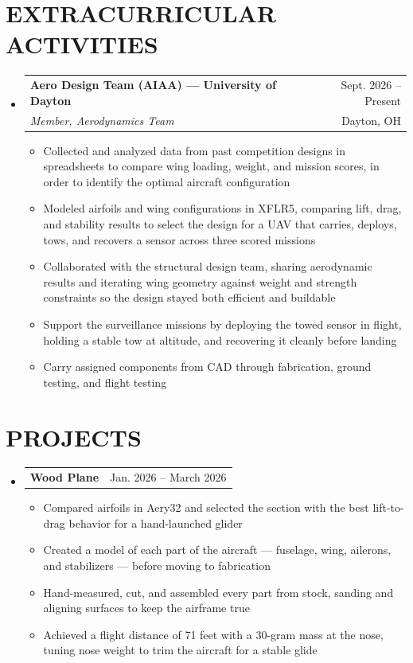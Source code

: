 \documentclass[letterpaper,11pt]{article}
\makeatletter
\newcommand{\resumeItem}[1]{
  \item\small{
    {#1 \vspace{-1pt}}
  }
}
\newcommand{\resumeSubheading}[4]{
  \vspace{-1pt}\item
    \begin{tabular*}{\textwidth}[t]{l@{\extracolsep{\fill}}r}
      \textbf{#1} & {\color{dark-grey}\small #2}\vspace{1pt}\\ %
      \textit{#3} & {\color{dark-grey} \small #4}\\ %
    \end{tabular*}\vspace{-4pt}
}
\newcommand{\resumeProjectHeading}[2]{
    \item
    \begin{tabular*}{\textwidth}{l@{\extracolsep{\fill}}r}
      #1 & {\color{dark-grey}\small #2} \\
    \end{tabular*}\vspace{-4pt}
}
\newcommand{\resumeSubHeadingListStart}{\begin{itemize}[leftmargin=0in, label={}]}
\newcommand{\resumeSubHeadingListEnd}{\end{itemize}}
\newcommand{\resumeItemListStart}{\begin{itemize}}
\newcommand{\resumeItemListEnd}{\end{itemize}\vspace{0pt}}
\makeatother
\begin{document}
\section{EXTRACURRICULAR ACTIVITIES}
  \resumeSubHeadingListStart
    \resumeSubheading
    {Aero Design Team (AIAA) --- University of Dayton}{Sept. 2026 -- Present}{Member, Aerodynamics Team}{Dayton, OH}
        \resumeItemListStart
            \resumeItem{Collected and analyzed data from past competition designs in spreadsheets to compare wing loading, weight, and mission scores, in order to identify the optimal aircraft configuration}
            \resumeItem{Modeled airfoils and wing configurations in XFLR5, comparing lift, drag, and stability results to select the design for a UAV that carries, deploys, tows, and recovers a sensor across three scored missions}
            \resumeItem{Collaborated with the structural design team, sharing aerodynamic results and iterating wing geometry against weight and strength constraints so the design stayed both efficient and buildable}
            \resumeItem{Support the surveillance missions by deploying the towed sensor in flight, holding a stable tow at altitude, and recovering it cleanly before landing}
            \resumeItem{Carry assigned components from CAD through fabrication, ground testing, and flight testing}
        \resumeItemListEnd

  \resumeSubHeadingListEnd


\section{PROJECTS}
    \resumeSubHeadingListStart
      
    \resumeProjectHeading
        {\textbf{Wood Plane}} {Jan. 2026 -- March 2026}
        \resumeItemListStart   
            \resumeItem{Compared airfoils in Aery32 and selected the section with the best lift-to-drag behavior for a hand-launched glider}
            \resumeItem{Created a model of each part of the aircraft --- fuselage, wing, ailerons, and stabilizers --- before moving to fabrication}
            \resumeItem{Hand-measured, cut, and assembled every part from stock, sanding and aligning surfaces to keep the airframe true}
            \resumeItem{Achieved a flight distance of 71 feet with a 30-gram mass at the nose, tuning nose weight to trim the aircraft for a stable glide}
        \resumeItemListEnd
    \resumeSubHeadingListEnd
\end{document}
